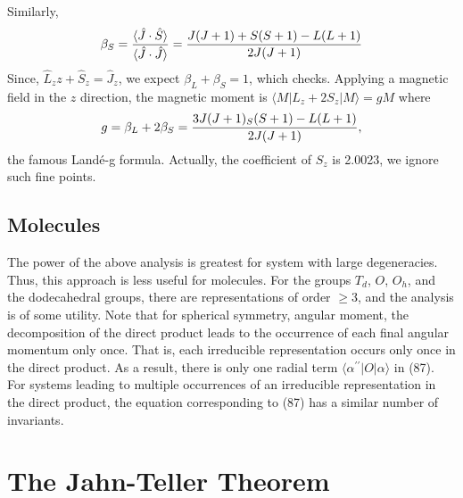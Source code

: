 Similarly,
\begin{equation}
\beta_S = {\langle {\hat{J}} \cdot {\hat{S}} \rangle \over 
\langle {\hat{J}} \cdot {\hat{J}} \rangle} = {J(J+1)+S(S+1)-L(L+1) 
\over 2J(J+1)}
\end{equation}
Since, ${\hat{L}}_zz + {\hat{S}}_z = {\hat{J}}_z$, we expect 
$\beta_L + \beta_S = 1$, which checks.  Applying a magnetic field 
in the $z$ direction, the magnetic moment is $\langle M | L_z + 
2S_z | M \rangle = gM$ where
\begin{equation}
g = \beta_L + 2\beta_S = {3J(J+1)_S(S+1)-L(L+1) \over 2J(J+1)},
\end{equation}
the famous Land\'e-g formula.  Actually, the coefficient of $S_z$ 
is 2.0023, we ignore such fine points.

\subsection{Molecules}

The power of the above analysis is greatest for system with large 
degeneracies.  Thus, this approach is less useful for molecules.  For 
the groups $T_d$, $O$, $O_h$, and the dodecahedral groups, there are 
representations of order $\geq 3$, and the analysis is of some 
utility.  Note that for spherical symmetry, angular moment, the 
decomposition of the direct product leads to the occurrence of each 
final angular momentum only once.   That is, each irreducible 
representation occurs only once in the direct product.  As a result, 
there is only one radial term $\langle \alpha^{\prime\prime} | O | 
\alpha \rangle$ in (87).  For systems leading to multiple occurrences 
of an irreducible representation in the direct product, the equation 
corresponding to (87) has a similar number of invariants.


\section{The Jahn-Teller Theorem}

\begin{figure}
\caption{}
\label{chap16-fig43}
\end{figure}

\begin{figure}
\caption{}
\label{chap16-fig44}
\end{figure}

\begin{figure}
\caption{}
\label{chap16-fig45}
\end{figure}

